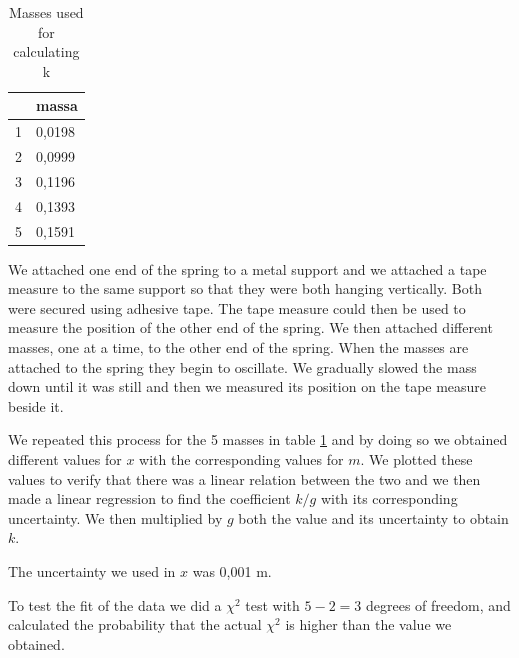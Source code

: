 \documentclass{article}
\begin{document}
\begin{table}
    \centering
    \begin{tabular}{|l|l|}
    \hline
         & massa \\ \hline
        1 & 0,0198 \\ \hline
        2 & 0,0999 \\ \hline
        3 & 0,1196 \\ \hline
        4 & 0,1393 \\ \hline
        5 & 0,1591 \\ \hline
    \end{tabular}
    \caption{Masses used for calculating k}
    \label{tab:regm}
\end{table}
We attached one end of the spring to a metal support and we attached a tape measure to the same support so that they were both hanging vertically. Both were secured using adhesive tape. The tape measure could then be used to measure the position of the other end of the spring. We then attached different masses, one at a time, to the other end of the spring. When the masses are attached to the spring they begin to oscillate. We gradually slowed the mass down until it was still and then we measured its position on the tape measure beside it. 

We repeated this process for the 5 masses in table \ref{tab:regm} and by doing so we obtained different values for $x$ with the
corresponding values for $m$. We plotted these values to verify that
there was a linear relation between the two and we then made a linear
regression to find the coefficient $k/g$ with its corresponding
uncertainty. We then multiplied by $g$ both the value and its uncertainty to obtain $k$. 

The uncertainty we used in $x$ was 0,001 m.

To test the fit of the data we did a $\chi^2$ test with $5-2 = 3$ degrees of freedom, and calculated the probability that the actual $\chi^2$ is higher than the value we obtained.
\end{document}
